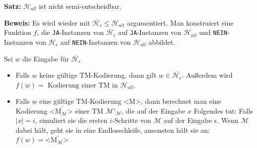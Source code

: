 \documentclass{scrartcl}%
\begin{document}
    \newpage
    \textbf{\textsf{Satz:}} $\mathcal{H}_{all}$ ist nicht semi-entscheidbar.

    \vspace*{0.3cm}
    \textbf{\textsf{Beweis:}}
    Es wird wieder mit $\overline{\mathcal{H}_\epsilon} \leq \mathcal{H}_{all}$ argumentiert.
    Man konstruiert eine Funktion $f$, die \texttt{JA}-Instanzen von $\overline{\mathcal{H}_\epsilon}$ auf \texttt{JA}-Instanzen von
    $\mathcal{H}_{all}$ und \texttt{NEIN}-Instanzen von $\overline{\mathcal{H}_\epsilon}$ auf \texttt{NEIN}-Instanzen von
    $\mathcal{H}_{all}$ abbildet.

    Sei $w$ die Eingabe für $\overline{\mathcal{H}_\epsilon}$
    \begin{itemize}
        \item Falls $w$ keine gültige TM-Kodierung, dann gilt $w \in \overline{\mathcal{H}_\epsilon}$. \newline Außerdem wird $f(w)= \text{ Kodierung einer TM in } \mathcal{H}_{all}$.
        \item Falls $w$ eine gültige TM-Kodierung <M>, dann berechnet man eine Kodierung $\text{<M}^{'}_{\mathcal{M}}\text{>}$ einer TM $\mathcal{M}'_{\mathcal{M}}$,
        die auf der Eingabe $x$ Folgendes tut:
        Falls $|x|=i$, simuliert sie die ersten $i$-Schritte von $\mathcal{M}$ auf der Eingabe $\epsilon$.
        Wenn $\mathcal{M}$ dabei hält, geht sie in eine Endlosschleife, ansonsten hält sie an: $f(w)=\text{<M}^{'}_{\mathcal{M}}\text{>}$
    \end{itemize}
\end{document}

